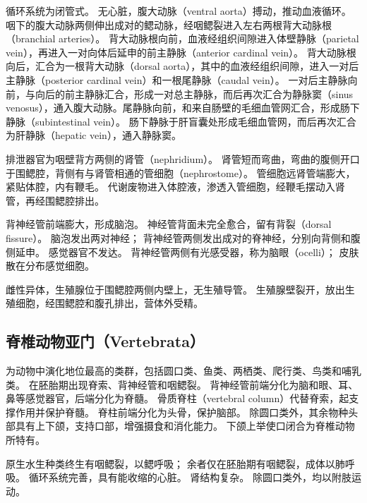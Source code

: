 \documentclass[11pt]{article}
\begin{document}
\newline

循环系统为闭管式。
无心脏，腹大动脉（ventral aorta）搏动，推动血液循环。
咽下的腹大动脉两侧伸出成对的鳃动脉，经咽鳃裂进入左右两根背大动脉根（branchial arteries）。
背大动脉根向前，血液经组织间隙进入体壁静脉（parietal vein），再进入一对向体后延申的前主静脉（anterior cardinal vein）。
背大动脉根向后，汇合为一根背大动脉（dorsal aorta），其中的血液经组织间隙，进入一对后主静脉（posterior cardinal vein）和一根尾静脉（caudal vein）。
一对后主静脉向前，与向后的前主静脉汇合，形成一对总主静脉，而后再次汇合为静脉窦（sinus venosus），通入腹大动脉。尾静脉向前，和来自肠壁的毛细血管网汇合，形成肠下静脉（subintestinal vein）。
肠下静脉于肝盲囊处形成毛细血管网，而后再次汇合为肝静脉（hepatic vein），通入静脉窦。

\newline

排泄器官为咽壁背方两侧的肾管（nephridium）。
肾管短而弯曲，弯曲的腹侧开口于围鳃腔，背侧有与肾管相通的管细胞（nephrostome）。
管细胞远肾管端膨大，紧贴体腔，内有鞭毛。
代谢废物进入体腔液，渗透入管细胞，经鞭毛摆动入肾管，再经围鳃腔排出。

\newline

背神经管前端膨大，形成脑泡。
神经管背面未完全愈合，留有背裂（dorsal fissure）。
脑泡发出两对神经；
背神经管两侧发出成对的脊神经，分别向背侧和腹侧延申。
感觉器官不发达。
背神经管两侧有光感受器，称为脑眼（ocelli）；
皮肤散在分布感觉细胞。

\newline

雌性异体，生殖腺位于围鳃腔两侧内壁上，无生殖导管。
生殖腺壁裂开，放出生殖细胞，经围鳃腔和腹孔排出，营体外受精。
  
\subsection{脊椎动物亚门（Vertebrata）}
为动物中演化地位最高的类群，包括圆口类、鱼类、两栖类、爬行类、鸟类和哺乳类。
在胚胎期出现脊索、背神经管和咽鳃裂。
背神经管前端分化为脑和眼、耳、鼻等感觉器官，后端分化为脊髓。
骨质脊柱（vertebral column）代替脊索，起支撑作用并保护脊髓。
脊柱前端分化为头骨，保护脑部。
除圆口类外，其余物种头部具有上下颌，支持口部，增强摄食和消化能力。
下颌上举使口闭合为脊椎动物所特有。

\newline

原生水生种类终生有咽鳃裂，以鳃呼吸；
余者仅在胚胎期有咽鳃裂，成体以肺呼吸。
循环系统完善，具有能收缩的心脏。
肾结构复杂。
除圆口类外，均以附肢运动。
\end{document}
